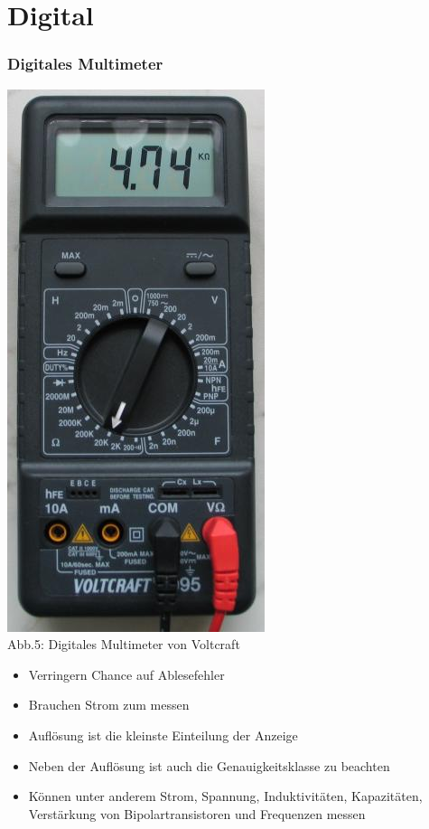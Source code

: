 \section*{Digital}

\begin{frame}
    \frametitle{Digitales Multimeter}
    \begin{minipage}{0.5\textwidth}
    \begin{center}
        \includegraphics[width=.35\textwidth]{a16/digitalmultimeter.jpg}\\
        Abb.5: Digitales Multimeter von Voltcraft \cite{wmde}
	\end{center}
	\end{minipage}
	\begin{minipage}{0.4\textwidth}
		\begin{itemize}
			\item	Verringern Chance auf Ablesefehler
			\item	Brauchen Strom zum messen
			\item	Auflösung ist die kleinste Einteilung der Anzeige
		\end{itemize}			
	\end{minipage}
	\vspace{3mm}
	\begin{itemize}
		\item	Neben der Auflösung ist auch die Genauigkeitsklasse zu beachten
		\item	Können unter anderem Strom, Spannung, Induktivitäten, Kapazitäten, Verstärkung von Bipolartransistoren und Frequenzen messen
	\end{itemize}
\end{frame}

